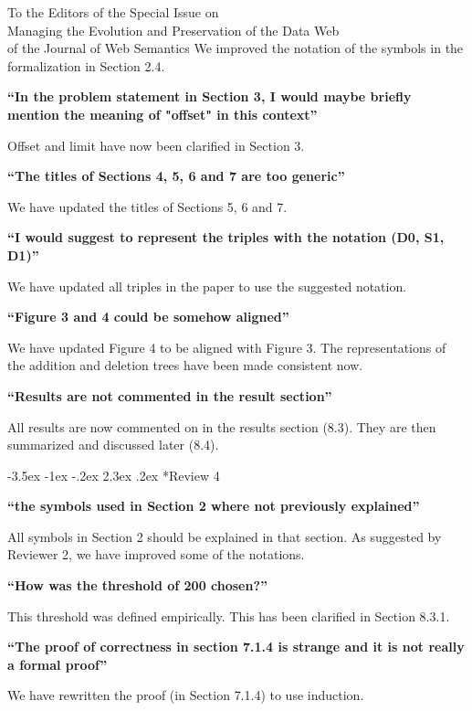\documentclass{letter}
\makeatletter
\newcounter{section}
\newcommand\section{\@startsection {section}{1}{\z@}%
                                   {-3.5ex \@plus -1ex \@minus -.2ex}%
                                   {2.3ex \@plus.2ex}%
                                   {\normalfont\Large\bfseries}}
\makeatother
\begin{document}
\begin{letter}{To the Editors of the Special Issue on\\Managing the Evolution and Preservation of the Data Web\\of the Journal of Web Semantics}
We improved the notation of the symbols in the formalization in Section 2.4.

\textbf{\enquote{In the problem statement in Section 3, I would maybe briefly mention the meaning of "offset" in this context}}

Offset and limit have now been clarified in Section 3.

\textbf{\enquote{The titles of Sections 4, 5, 6 and 7 are too generic}}

We have updated the titles of Sections 5, 6 and 7.

\textbf{\enquote{I would suggest to represent the triples with the notation (D0, S1, D1)}}

We have updated all triples in the paper to use the suggested notation.

\textbf{\enquote{Figure 3 and 4 could be somehow aligned}}

We have updated Figure 4 to be aligned with Figure 3.
The representations of the addition and deletion trees have been made consistent now.

\textbf{\enquote{Results are not commented in the result section}}

All results are now commented on in the results section (8.3).
They are then summarized and discussed later (8.4).

\section*{Review 4}

\textbf{\enquote{the symbols used in Section 2 where not previously explained}}

All symbols in Section 2 should  be explained in that section.
As suggested by Reviewer 2, we have improved some of the notations.

\textbf{\enquote{How was the threshold of 200 chosen?}}

This threshold was defined empirically.
This has been clarified in Section 8.3.1.

\textbf{\enquote{The proof of correctness in section 7.1.4 is strange and it is not really a formal proof}}

We have rewritten the proof (in Section 7.1.4) to use induction.

\end{letter}
\end{document}
